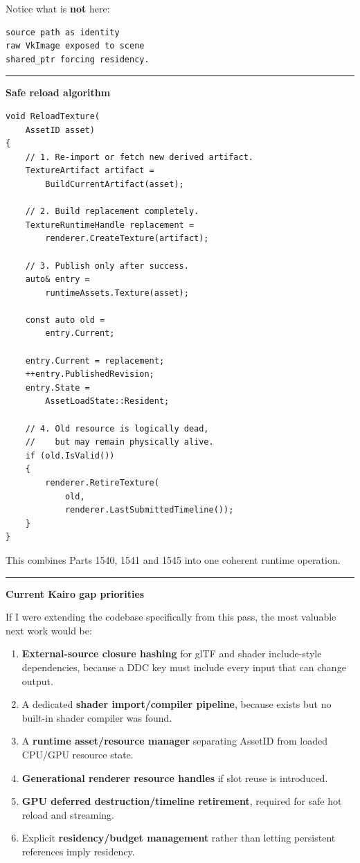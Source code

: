 Notice what is \textbf{not} here:

\begin{verbatim}
source path as identity
raw VkImage exposed to scene
shared_ptr forcing residency.
\end{verbatim}

\begin{center}\rule{0.5\linewidth}{0.5pt}\end{center}

\textbf{Safe reload algorithm}

\begin{verbatim}
void ReloadTexture(
    AssetID asset)
{
    // 1. Re-import or fetch new derived artifact.
    TextureArtifact artifact =
        BuildCurrentArtifact(asset);

    // 2. Build replacement completely.
    TextureRuntimeHandle replacement =
        renderer.CreateTexture(artifact);

    // 3. Publish only after success.
    auto& entry =
        runtimeAssets.Texture(asset);

    const auto old =
        entry.Current;

    entry.Current = replacement;
    ++entry.PublishedRevision;
    entry.State =
        AssetLoadState::Resident;

    // 4. Old resource is logically dead,
    //    but may remain physically alive.
    if (old.IsValid())
    {
        renderer.RetireTexture(
            old,
            renderer.LastSubmittedTimeline());
    }
}
\end{verbatim}

This combines Parts 1540, 1541 and 1545 into one coherent runtime operation.

\begin{center}\rule{0.5\linewidth}{0.5pt}\end{center}

\textbf{Current Kairo gap priorities}

If I were extending the codebase specifically from this pass, the most valuable next work would be:

\begin{enumerate}
\def\labelenumi{\arabic{enumi}.}
\item
  \textbf{External-source closure hashing} for glTF and shader include-style dependencies, because a DDC key must include every input that can change output.
\item
  A dedicated \textbf{shader import/compiler pipeline}, because  exists but no built-in shader compiler was found.
\item
  A \textbf{runtime asset/resource manager} separating AssetID from loaded CPU/GPU resource state.
\item
  \textbf{Generational renderer resource handles} if slot reuse is introduced.
\item
  \textbf{GPU deferred destruction/timeline retirement}, required for safe hot reload and streaming.
\item
  Explicit \textbf{residency/budget management} rather than letting persistent references imply residency.
\end{enumerate}

